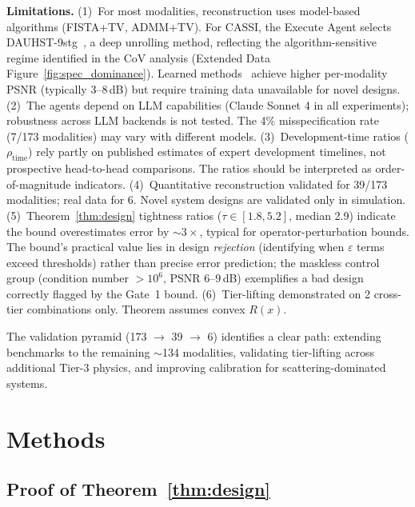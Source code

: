 \documentclass[11pt,a4paper]{article}
\newcommand{\eps}{\varepsilon}
\begin{document}
\textbf{Limitations.}
(1)~For most modalities, reconstruction uses model-based algorithms (FISTA+TV, ADMM+TV).  For CASSI, the Execute Agent selects DAUHST-9stg~\cite{cai2022dauhst}, a deep unrolling method, reflecting the algorithm-sensitive regime identified in the CoV analysis (Extended Data Figure~\ref{fig:spec_dominance}).  Learned methods~\cite{aggarwal2019modl,adler2018learned} achieve higher per-modality PSNR (typically 3--8\,dB) but require training data unavailable for novel designs.
(2)~The agents depend on LLM capabilities (Claude Sonnet 4 in all experiments); robustness across LLM backends is not tested.  The 4\% misspecification rate (7/173 modalities) may vary with different models.
(3)~Development-time ratios ($\rho_{\text{time}}$) rely partly on published estimates of expert development timelines, not prospective head-to-head comparisons.  The ratios should be interpreted as order-of-magnitude indicators.
(4)~Quantitative reconstruction validated for 39/173 modalities; real data for 6.  Novel system designs are validated only in simulation.
(5)~Theorem~\ref{thm:design} tightness ratios ($\tau \in [1.8, 5.2]$, median 2.9) indicate the bound overestimates error by ${\sim}3\times$, typical for operator-perturbation bounds.  The bound's practical value lies in design \emph{rejection} (identifying when $\eps$ terms exceed thresholds) rather than precise error prediction; the maskless control group (condition number $>10^6$, PSNR 6--9\,dB) exemplifies a bad design correctly flagged by the Gate~1 bound.
(6)~Tier-lifting demonstrated on 2 cross-tier combinations only.  Theorem assumes convex $R(x)$.

The validation pyramid (173 $\to$ 39 $\to$ 6) identifies a clear path: extending benchmarks to the remaining ${\sim}$134 modalities, validating tier-lifting across additional Tier-3 physics, and improving calibration for scattering-dominated systems.

\section{Methods}

\subsection{Proof of Theorem~\ref{thm:design}}
\end{document}
